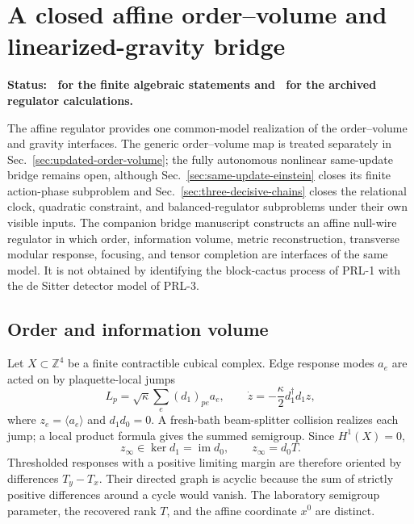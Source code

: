 \section{A closed affine order--volume and linearized-gravity bridge}
\label{sec:affine-null-wire-closure}

\textbf{Status: \StatusModel\ for the finite algebraic statements and
\StatusNumerical\ for the archived regulator calculations.}

The affine regulator provides one common-model realization of the
order--volume and gravity interfaces.  The generic order--volume map is
treated separately in Sec.~\ref{sec:updated-order-volume}; the
fully autonomous nonlinear same-update bridge remains open, although
Sec.~\ref{sec:same-update-einstein} closes its finite action-phase
subproblem and Sec.~\ref{sec:three-decisive-chains} closes the relational
clock, quadratic constraint, and balanced-regulator subproblems under their
own visible inputs.  The companion bridge manuscript
\cite{XuOrderVolumeEinstein2026} constructs an affine null-wire regulator in
which order, information volume, metric reconstruction, transverse modular
response, focusing, and tensor completion are interfaces of the same model.
It is not obtained by identifying the block-cactus process of PRL-1 with the
de Sitter detector model of PRL-3.

\subsection{Order and information volume}

Let \(X\subset\mathbb Z^4\) be a finite contractible cubical complex.  Edge
response modes \(a_e\) are acted on by plaquette-local jumps
\begin{equation}
 L_p=\sqrt\kappa\sum_e(d_1)_{pe}a_e ,
 \qquad
 \dot z=-\frac{\kappa}{2}d_1^\dagger d_1z ,
 \label{eq:affine-hodge-flow}
\end{equation}
where \(z_e=\langle a_e\rangle\) and \(d_1d_0=0\).  A fresh-bath
beam-splitter collision realizes each jump; a local product formula gives the
summed semigroup.  Since \(H^1(X)=0\),
\begin{equation}
 z_\infty\in\ker d_1=\operatorname{im}d_0,
 \qquad z_\infty=d_0T .
 \label{eq:affine-exact-form}
\end{equation}
Thresholded responses with a positive limiting margin are therefore oriented
by differences \(T_y-T_x\).  Their directed graph is acyclic because the sum
of strictly positive differences around a cycle would vanish.  The laboratory
semigroup parameter, the recovered rank \(T\), and the affine coordinate
\(x^0\) are distinct.

